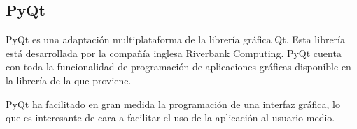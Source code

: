 \subsection*{PyQt}
PyQt es una adaptación multiplataforma de la librería gráfica Qt. Esta librería está desarrollada por la compañía inglesa Riverbank Computing. PyQt cuenta con toda la funcionalidad de programación de aplicaciones gráficas disponible en la librería de la que proviene.

PyQt ha facilitado en gran medida la programación de una interfaz gráfica, lo que es interesante de cara a facilitar el uso de la aplicación al usuario medio.
\newpage